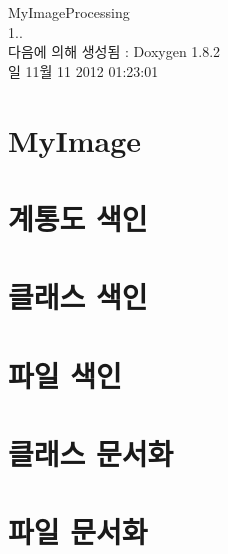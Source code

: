 \documentclass{book}
\begin{document}
\hypersetup{pageanchor=false,citecolor=blue}
\begin{titlepage}
\vspace*{7cm}
\begin{center}
{\Large My\-Image\-Processing \\[1ex]\large 1.. }\\
\vspace*{1cm}
{\large 다음에 의해 생성됨 \-:  Doxygen 1.8.2}\\
\vspace*{0.5cm}
{\small 일 11월 11 2012 01:23:01}\\
\end{center}
\end{titlepage}
\clearemptydoublepage
{}
\tableofcontents
\clearemptydoublepage
{}
\hypersetup{pageanchor=true,citecolor=blue}
\chapter{My\-Image}
\label{index}\hypertarget{index}{}
\chapter{계통도 색인}

\chapter{클래스 색인}

\chapter{파일 색인}

\chapter{클래스 문서화}















\chapter{파일 문서화}






























\printindex
\end{document}
